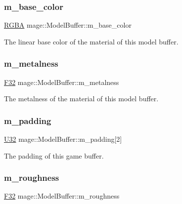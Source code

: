 \subsubsection{\texorpdfstring{m\+\_\+base\+\_\+color}{m\_base\_color}}
{\footnotesize\ttfamily \hyperlink{structmage_1_1_r_g_b_a}{R\+G\+BA} mage\+::\+Model\+Buffer\+::m\+\_\+base\+\_\+color}

The linear base color of the material of this model buffer. \hypertarget{structmage_1_1_model_buffer_a1be491fffd79c3e5d37d066f0ef9ab96}{}\label{structmage_1_1_model_buffer_a1be491fffd79c3e5d37d066f0ef9ab96} 
\subsubsection{\texorpdfstring{m\+\_\+metalness}{m\_metalness}}
{\footnotesize\ttfamily \hyperlink{namespacemage_aa97e833b45f06d60a0a9c4fc22ae02c0}{F32} mage\+::\+Model\+Buffer\+::m\+\_\+metalness}

The metalness of the material of this model buffer. \hypertarget{structmage_1_1_model_buffer_a11ae104f8ba32afbd910a2f18d04d352}{}\label{structmage_1_1_model_buffer_a11ae104f8ba32afbd910a2f18d04d352} 
\subsubsection{\texorpdfstring{m\+\_\+padding}{m\_padding}}
{\footnotesize\ttfamily \hyperlink{namespacemage_a41c104c036fba3756a74e19f793eeaa1}{U32} mage\+::\+Model\+Buffer\+::m\+\_\+padding\mbox{[}2\mbox{]}}

The padding of this game buffer. \hypertarget{structmage_1_1_model_buffer_a33adb9ff193fcccf618bf6ceb7b1a31e}{}\label{structmage_1_1_model_buffer_a33adb9ff193fcccf618bf6ceb7b1a31e} 
\subsubsection{\texorpdfstring{m\+\_\+roughness}{m\_roughness}}
{\footnotesize\ttfamily \hyperlink{namespacemage_aa97e833b45f06d60a0a9c4fc22ae02c0}{F32} mage\+::\+Model\+Buffer\+::m\+\_\+roughness}

